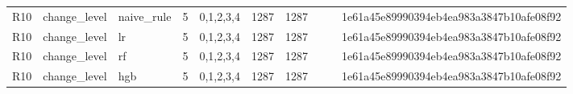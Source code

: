 \begin{table}[htbp]
{\begin{tabular}{lllrrrrrrl}
R10 & change\_level & naive\_rule & 5 & 0,1,2,3,4 & 1287 & 1287 &  &  & 1e61a45e89990394eb4ea983a3847b10afe08f92 \\
R10 & change\_level & lr & 5 & 0,1,2,3,4 & 1287 & 1287 &  &  & 1e61a45e89990394eb4ea983a3847b10afe08f92 \\
R10 & change\_level & rf & 5 & 0,1,2,3,4 & 1287 & 1287 &  &  & 1e61a45e89990394eb4ea983a3847b10afe08f92 \\
R10 & change\_level & hgb & 5 & 0,1,2,3,4 & 1287 & 1287 &  &  & 1e61a45e89990394eb4ea983a3847b10afe08f92 \\
\bottomrule
\end{tabular}}
\end{table}
